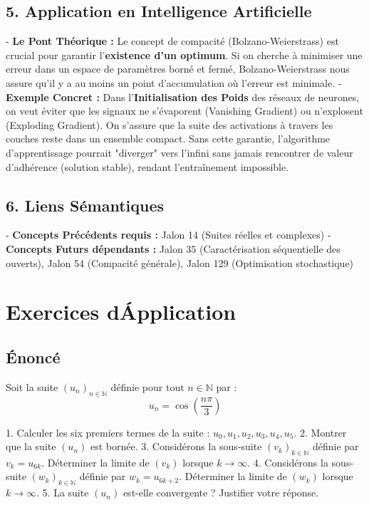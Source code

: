 \documentclass{report}
\begin{document}
\section*{5. Application en Intelligence Artificielle}
- \textbf{Le Pont Théorique :} Le concept de compacité (Bolzano-Weierstrass) est crucial pour garantir l'\textbf{existence d'un optimum}. Si on cherche à minimiser une erreur dans un espace de paramètres borné et fermé, Bolzano-Weierstrass nous assure qu'il y a au moins un point d'accumulation où l'erreur est minimale.
- \textbf{Exemple Concret :} Dans l'\textbf{Initialisation des Poids} des réseaux de neurones, on veut éviter que les signaux ne s'évaporent (Vanishing Gradient) ou n'explosent (Exploding Gradient). On s'assure que la suite des activations à travers les couches reste dans un ensemble compact. Sans cette garantie, l'algorithme d'apprentissage pourrait "diverger" vers l'infini sans jamais rencontrer de valeur d'adhérence (solution stable), rendant l'entraînement impossible.

\section*{6. Liens Sémantiques}
- \textbf{Concepts Précédents requis :} Jalon 14 (Suites réelles et complexes)
- \textbf{Concepts Futurs dépendants :} Jalon 35 (Caractérisation séquentielle des ouverts), Jalon 54 (Compacité générale), Jalon 129 (Optimisation stochastique)

\newpage
\chapter*{Exercices d\'Application}


\section*{Énoncé}

Soit la suite $(u_n)_{n \in \mathbb{N}}$ définie pour tout $n \in \mathbb{N}$ par :
$$u_n = \cos\left(\frac{n\pi}{3}\right)$$

1.  Calculer les six premiers termes de la suite : $u_0, u_1, u_2, u_3, u_4, u_5$.
2.  Montrer que la suite $(u_n)$ est bornée.
3.  Considérons la sous-suite $(v_k)_{k \in \mathbb{N}}$ définie par $v_k = u_{6k}$. Déterminer la limite de $(v_k)$ lorsque $k \to \infty$.
4.  Considérons la sous-suite $(w_k)_{k \in \mathbb{N}}$ définie par $w_k = u_{6k+2}$. Déterminer la limite de $(w_k)$ lorsque $k \to \infty$.
5.  La suite $(u_n)$ est-elle convergente ? Justifier votre réponse.
\end{document}
